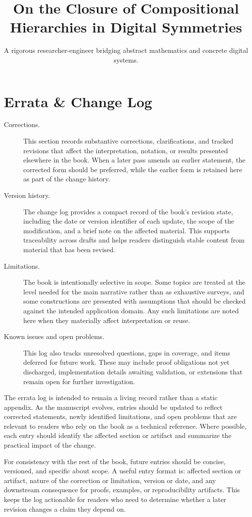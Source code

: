 \documentclass[11pt]{article}
\title{On the Closure of Compositional Hierarchies in Digital Symmetries}
\author{A rigorous researcher-engineer bridging abstract mathematics and concrete digital systems.}
\begin{document}
\section*{Errata \& Change Log}

\begin{description}
  \item[Corrections.] This section records substantive corrections, clarifications, and tracked revisions that affect the interpretation, notation, or results presented elsewhere in the book. When a later pass amends an earlier statement, the corrected form should be preferred, while the earlier form is retained here as part of the change history.

  \item[Version history.] The change log provides a compact record of the book's revision state, including the date or version identifier of each update, the scope of the modification, and a brief note on the affected material. This supports traceability across drafts and helps readers distinguish stable content from material that has been revised.

  \item[Limitations.] The book is intentionally selective in scope. Some topics are treated at the level needed for the main narrative rather than as exhaustive surveys, and some constructions are presented with assumptions that should be checked against the intended application domain. Any such limitations are noted here when they materially affect interpretation or reuse.

  \item[Known issues and open problems.] This log also tracks unresolved questions, gaps in coverage, and items deferred for future work. These may include proof obligations not yet discharged, implementation details awaiting validation, or extensions that remain open for further investigation.
\end{description}

The errata log is intended to remain a living record rather than a static appendix. As the manuscript evolves, entries should be updated to reflect corrected statements, newly identified limitations, and open problems that are relevant to readers who rely on the book as a technical reference. Where possible, each entry should identify the affected section or artifact and summarize the practical impact of the change.

For consistency with the rest of the book, future entries should be concise, versioned, and specific about scope. A useful entry format is: affected section or artifact, nature of the correction or limitation, version or date, and any downstream consequence for proofs, examples, or reproducibility artifacts. This keeps the log actionable for readers who need to determine whether a later revision changes a claim they depend on.
\end{document}
